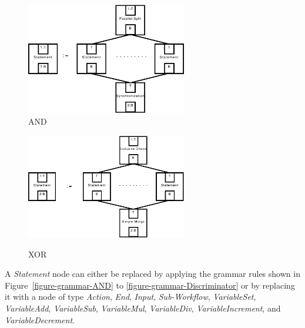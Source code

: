 \begin{figure}[htb]
  \begin{minipage}{0.45\textwidth}
    \begin{center}
      \includegraphics[width=7cm]{figures/grammar/and}\\[5mm]
      \caption[The \emph{AND} grammar rule]{AND}
      \label{figure-grammar-AND}
    \end{center}
  \end{minipage}
  \hfill
  \begin{minipage}{0.45\textwidth}
    \begin{center}
      \includegraphics[width=7cm]{figures/grammar/xor}\\[5mm]
      \caption[The \emph{XOR} grammar rule]{XOR}
      \label{figure-grammar-XOR}
    \end{center}
  \end{minipage}
\end{figure}

A \emph{Statement} node can either be replaced by applying the grammar rules
shown in Figure~\ref{figure-grammar-AND} to \ref{figure-grammar-Discriminator}
or by replacing it with a node of type \emph{Action}, \emph{End}, \emph{Input},
\emph{Sub-Workflow}, \emph{VariableSet}, \emph{VariableAdd}, \emph{VariableSub},
\emph{VariableMul}, \emph{VariableDiv}, \emph{VariableIncrement}, and
\emph{VariableDecrement}.

